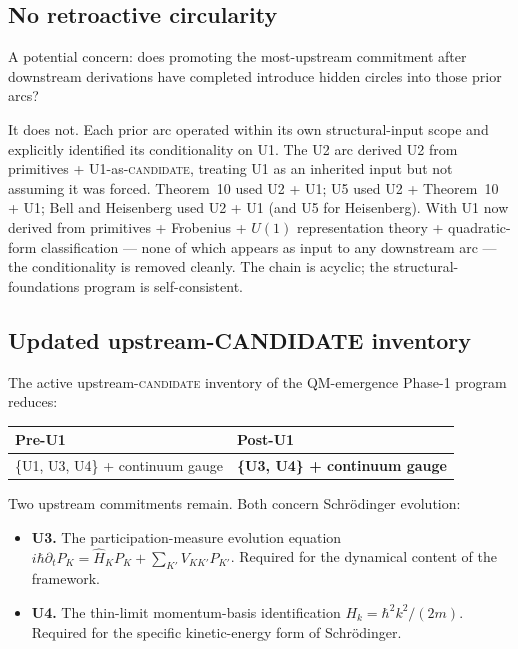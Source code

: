 \documentclass[11pt,a4paper]{article}
\begin{document}
\subsection{No retroactive circularity}

A potential concern: does promoting the most-upstream commitment after downstream derivations have completed introduce hidden circles into those prior arcs?

It does not. Each prior arc operated within its own structural-input scope and explicitly identified its conditionality on U1. The U2 arc derived U2 from primitives + U1-as-\textsc{candidate}, treating U1 as an inherited input but not assuming it was forced. Theorem~10 used U2 + U1; U5 used U2 + Theorem~10 + U1; Bell and Heisenberg used U2 + U1 (and U5 for Heisenberg). With U1 now derived from primitives + Frobenius + $U(1)$ representation theory + quadratic-form classification --- none of which appears as input to any downstream arc --- the conditionality is removed cleanly. The chain is acyclic; the structural-foundations program is self-consistent.

\subsection{Updated upstream-CANDIDATE inventory}

The active upstream-\textsc{candidate} inventory of the QM-emergence Phase-1 program reduces:

\begin{center}
\begin{tabular}{ll}
\hline
Pre-U1 & Post-U1 \\
\hline
\{U1, U3, U4\} + continuum gauge & \textbf{\{U3, U4\} + continuum gauge} \\
\hline
\end{tabular}
\end{center}

Two upstream commitments remain. Both concern Schr\"odinger evolution:
\begin{itemize}
  \item \textbf{U3.} The participation-measure evolution equation $i\hbar \partial_t P_K = \hat{H}_K P_K + \sum_{K'} V_{KK'} P_{K'}$. Required for the dynamical content of the framework.
  \item \textbf{U4.} The thin-limit momentum-basis identification $H_k = \hbar^2 k^2 / (2m)$. Required for the specific kinetic-energy form of Schr\"odinger.
\end{itemize}
\end{document}
